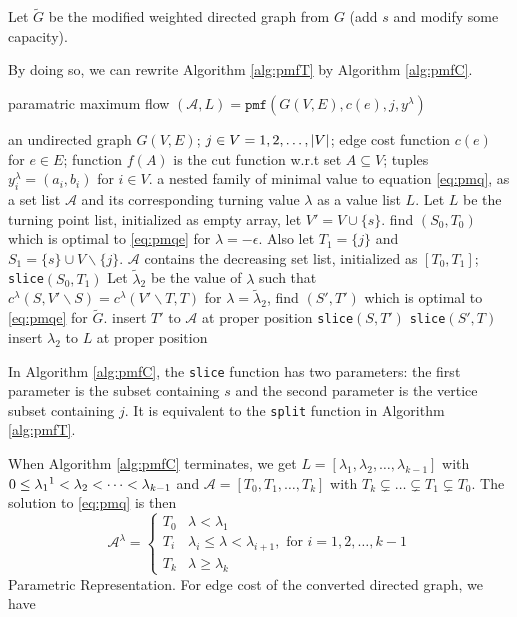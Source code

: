 \documentclass{article}
\begin{document}
Let $\widetilde{G}$ be the modified weighted directed graph from $G$ (add $s$ and modify some capacity). 


By doing so, we can rewrite Algorithm \ref{alg:pmfT} by Algorithm \ref{alg:pmfC}.
\begin{algorithm}
\caption{paramatric maximum flow $(\mathcal{A}, L) = \texttt{pmf}(G(V,E), c(e), j, y^{\lambda})$}\label{alg:pmfC}
\begin{algorithmic}[1]
\REQUIRE an undirected graph $G(V, E)$; $j \in V={1,2,\dots, \lvert V\rvert}$; edge cost function $c(e)$ for $e \in E$; function $f(A)$ is the cut function w.r.t set $A\subseteq V$; tuples $y^{\lambda}_i = (a_i, b_i)$ for $i \in V$.
\ENSURE a nested family of minimal value to equation \eqref{eq:pmq}, as a set list $\mathcal{A}$ and its corresponding turning value $\lambda$ as a value list $L$.
\STATE Let $L$ be the turning point list, initialized as empty array, let $V'=V\cup\{s\}$.
\STATE find $(S_0, T_0)$ which is optimal to \eqref{eq:pmqe} for $ \lambda  = -\epsilon$.  Also let $T_1 = \{j\}$ and $S_1 = \{s\}\cup V \backslash \{j\}$.
\STATE $\mathcal{A}$ contains the decreasing set list, initialized as $[T_0, T_1]$;
\STATE \texttt{slice}$( S_0, T_1)$
  \STATE Let $\tilde{\lambda}_2$ be the value of $\lambda$ such that $c^{\lambda}(S, V'\backslash S) = 
c^{\lambda}(V'\backslash T, T)$ \label{findLambda}
\STATE for $\lambda = \tilde{\lambda}_2$, find $(S', T')$ which is optimal to \eqref{eq:pmqe} for $\widetilde{G}$.
\STATE insert $T'$ to $\mathcal{A}$ at proper position
\STATE \texttt{slice}$(S, T')$
\STATE \texttt{slice}$(S', T)$
\ELSE
\STATE insert $\lambda_2$ to $L$ at proper position
\ENDIF
\ENDFUNCTION
\end{algorithmic}
\end{algorithm}
In Algorithm \ref{alg:pmfC}, the \texttt{slice} function has two parameters:
the first parameter is the subset containing $s$ and the second parameter is the vertice subset containing $j$. It is equivalent to the \texttt{split} function in Algorithm \ref{alg:pmfT}.

When Algorithm \ref{alg:pmfC} terminates, we get $L=[\lambda_1, \lambda_2, \dots, \lambda_{k-1}]$ with
$0 \leq \lambda_1 \footnotemark < \lambda_2 < \dots < \lambda_{k-1}$ and $\mathcal{A} = [T_0, T_1, \dots, T_k]$ with 
$T_k \subsetneq  \dots \subsetneq T_1 \subsetneq T_0$.  The solution to \eqref{eq:pmq} is then
\begin{equation}\label{eq:Alambda}
\mathcal{A}^{\lambda}=\begin{cases}
T_0 & \lambda < \lambda_1 \\
T_i & \lambda_i \leq \lambda < \lambda_{i+1}, \textrm{ for } i=1, 2, \dots, k-1 \\
T_k & \lambda \geq \lambda_{k}
\end{cases}
\end{equation}
Parametric Representation. For edge cost of the converted directed graph, we have
\end{document}
